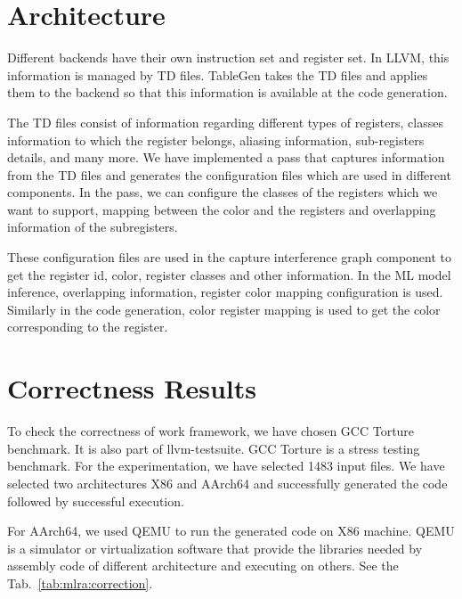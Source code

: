 \section{Architecture}\label{sec:mlra:arch}
Different backends have their own instruction set and register set. In LLVM, this information is managed by TD files. TableGen takes the TD files and applies them to the backend so that this information is available at the code generation.

The TD files consist of information regarding different types of registers, classes information to which the register belongs, aliasing information, sub-registers details, and many more.
We have implemented a pass that captures information from the TD files and generates the configuration files which are used in different components. In the pass, we can configure the classes of the registers which we want to support, mapping between the color and the registers and overlapping information of the subregisters. 

These configuration files are used in the capture interference graph component to get the register id, color, register classes and other information. In the ML model inference, overlapping information, register color mapping configuration is used. Similarly in the code generation, color register mapping is used to get the color corresponding to the register.

\section{Correctness Results}\label{sec:mlra:correct}
To check the correctness of work framework, we have chosen GCC Torture benchmark. It is also part of llvm-testsuite. GCC Torture is a stress testing benchmark. For the experimentation, we have selected 1483 input files. We have selected two architectures X86 and AArch64 and successfully generated the code followed by successful execution.

For AArch64, we used QEMU\cite{qemu} to run the generated code on X86 machine. QEMU is a simulator or virtualization software that provide the libraries needed by assembly code of different architecture and executing on others. See the Tab.~\ref{tab:mlra:correction}.




